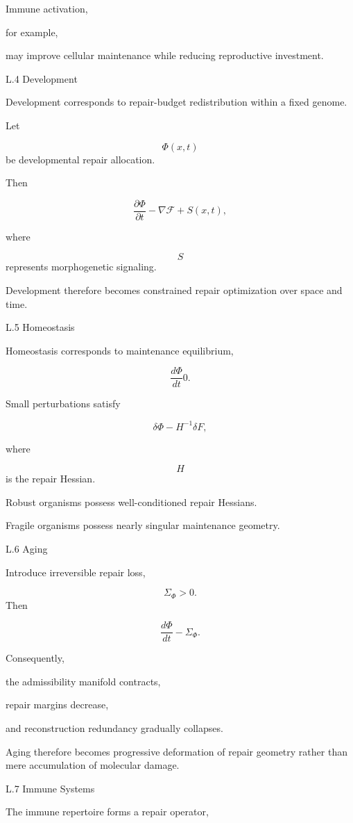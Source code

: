 \documentclass[12pt,oneside]{article}
\theoremstyle{plain}
\theoremstyle{definition}
\theoremstyle{remark}
\begin{document}
Immune activation,

for example,

may improve cellular maintenance while reducing reproductive investment.


L.4 Development

Development corresponds to repair-budget redistribution within a fixed genome.

Let

\[
\Phi(x,t)
\]
be developmental repair allocation.

Then

\[
\frac{\partial\Phi}{\partial t}
- 

\nabla
\mathcal F
+
S(x,t),
\]

where

\[
S
\]
represents morphogenetic signaling.

Development therefore becomes constrained repair optimization over space and time.


L.5 Homeostasis

Homeostasis corresponds to maintenance equilibrium,

\[
\frac{d\Phi}{dt}
0. 

\]

Small perturbations satisfy

\[
\delta\Phi
- 

H^{-1}
\delta F,
\]

where

\[
H
\]
is the repair Hessian.

Robust organisms possess well-conditioned repair Hessians.

Fragile organisms possess nearly singular maintenance geometry.


L.6 Aging

Introduce irreversible repair loss,

\[
\Sigma_\Phi>0.
\]
Then

\[
\frac{d\Phi}{dt}
- 

\Sigma_\Phi.
\]

Consequently,

the admissibility manifold contracts,

repair margins decrease,

and reconstruction redundancy gradually collapses.

Aging therefore becomes progressive deformation of repair geometry rather than mere accumulation of molecular damage.


L.7 Immune Systems

The immune repertoire forms a repair operator,
\end{document}
